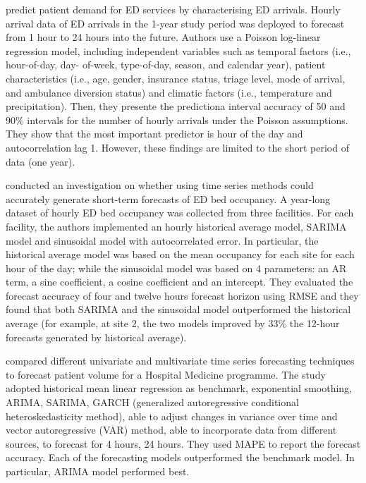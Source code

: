 \documentclass[]{elsarticle} %
\begin{document}
\citet{mccarthy2008challenge} predict patient demand for ED services by characterising ED arrivals. Hourly arrival data of ED arrivals in the 1-year study period was deployed to forecast from 1 hour to 24 hours into the future. Authors use a Poisson log-linear regression model, including independent variables such as temporal factors (i.e., hour-of-day, day- of-week, type-of-day, season, and calendar year), patient characteristics (i.e., age, gender, insurance status, triage level, mode of arrival, and ambulance diversion status) and climatic factors (i.e., temperature and precipitation).
Then, they presente the predictiona interval accuracy of 50 and 90\% intervals for the number of hourly arrivals under the Poisson assumptions. They show that the most important predictor is hour of the day and autocorrelation lag 1. However, these findings are limited to the short period of data (one year).

\citet{schweigler2009forecasting} conducted an investigation on whether using time series methods could accurately generate short-term forecasts of ED bed occupancy.
A year-long dataset of hourly ED bed occupancy was collected from three facilities. For each facility, the authors implemented an hourly historical average model, SARIMA model and sinusoidal model with autocorrelated error. In particular, the historical average model was based on the mean occupancy for each site for each hour of the day; while the sinusoidal model was based on 4 parameters: an AR term, a sine coefficient, a cosine coefficient and an intercept. They evaluated the forecast accuracy of four and twelve hours forecast horizon using RMSE and they found that both SARIMA and the sinusoidal model outperformed the historical average (for example, at site 2, the two models improved by 33\% the 12-hour forecasts generated by historical average).

\citet{kim2014predicting} compared different univariate and multivariate time series forecasting techniques to forecast patient volume for a Hospital Medicine programme.
The study adopted historical mean linear regression as benchmark, exponential smoothing, ARIMA, SARIMA, GARCH (generalized autoregressive conditional heteroskedasticity method), able to adjust changes in variance over time and vector autoregressive (VAR) method, able to incorporate data from different sources, to forecast for 4 hours, 24 hours. They used MAPE to report the forecast accuracy.
Each of the forecasting models outperformed the benchmark model. In particular, ARIMA model performed best.
\end{document}
